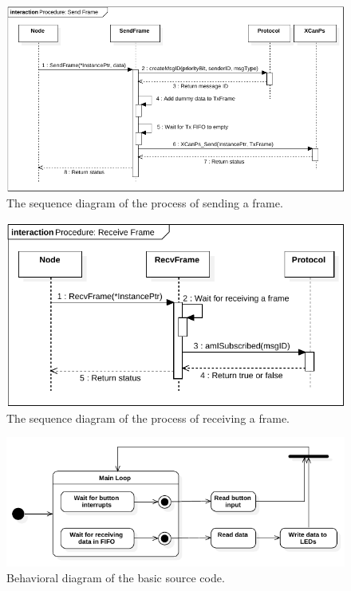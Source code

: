 \begin{figure}[h!]
	\centering
	\includegraphics[width = 1.1\linewidth]{graphics/SeqDiagram_SendFrame.pdf}
	\caption{The sequence diagram of the process of sending a frame.}
	\label{fig:SeqDiagram_SendFrame}
\end{figure}

\begin{figure}[h!]
	\centering
	\includegraphics[width = 1.1\linewidth]{graphics/SeqDiagram_RecvFrame.pdf}
	\caption{The sequence diagram of the process of receiving a frame.}
	\label{fig:SeqDiagram_RecvFrame}
\end{figure}

\begin{figure}[h!]
	\centering
	\includegraphics[width = 1.1\linewidth]{graphics/StateDiagram_CanStackTestCode.pdf}
	\caption{Behavioral diagram of the basic source code.}
	\label{fig:CAN_Testing_StateDiagr_Code}
\end{figure}